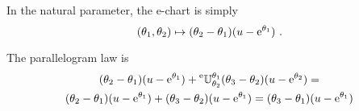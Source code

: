 \documentclass[12pt,a4paper]{amsart}
\begin{document}
In the natural parameter, the e-chart is simply
\begin{equation}
  \label{eq:6}
  (\theta_1,\theta_2) \mapsto (\theta_2-\theta_1) (u - \mathrm{e}^{\theta_1}) \ .
\end{equation}

The parallelogram law is
\begin{multline}
  \label{eq:7}
  (\theta_2 - \theta_1)(u - \mathrm{e}^{\theta_1}) + \prescript{\text{e}}{} {\mathbb U} _ {\theta_2} ^ {\theta_1} (\theta_3 - \theta_2)(u - \mathrm{e}^{\theta_2}) = \\  (\theta_2 - \theta_1)(u - \mathrm{e}^{\theta_1}) + (\theta_3 - \theta_2)(u - \mathrm{e}^{\theta_1}) = (\theta_3 - \theta_1)(u - \mathrm{e}^{\theta_1})
\end{multline}

% 


\end{document}
